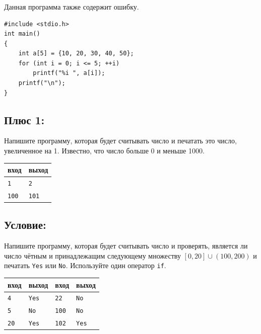 \documentclass[10pt]{article}
\begin{document}
\subsubsection{}
Данная программа также содержит ошибку.
\begin{lstlisting}
#include <stdio.h>
int main()
{
    int a[5] = {10, 20, 30, 40, 50};
    for (int i = 0; i <= 5; ++i)
    	printf("%i ", a[i]);
    printf("\n");
}
\end{lstlisting}



\subsection{Плюс 1:} 
Напишите программу, которая будет считывать число и печатать это число, увеличенное на 1. Известно, что число больше 0 и меньше 1000.
\begin{center}
\begin{tabular}{ l | l }
 вход & выход\\ \hline
 \texttt{1} & \texttt{2} \\ 
 \texttt{100} & \texttt{101} \\ 
\end{tabular}
\end{center}



\subsection{Условие:} 
Напишите программу, которая будет считывать число и проверять, является ли число чётным и принадлежащим следующему множеству 
$[0, 20] \cup (100, 200)$ и печатать \texttt{Yes} или \texttt{No}. Используйте один оператор \texttt{if}.

\begin{center}
\begin{tabular}{ l l | l l }
 вход & выход & вход & выход \\ \hline
 \texttt{4} & \texttt{Yes} & \texttt{22} & \texttt{No}   \\ 
 \texttt{5} & \texttt{No} &\texttt{100} & \texttt{No}  \\ 
 \texttt{20} & \texttt{Yes} & \texttt{102} & \texttt{Yes} \\ 
\end{tabular}
\end{center}
\end{document}
